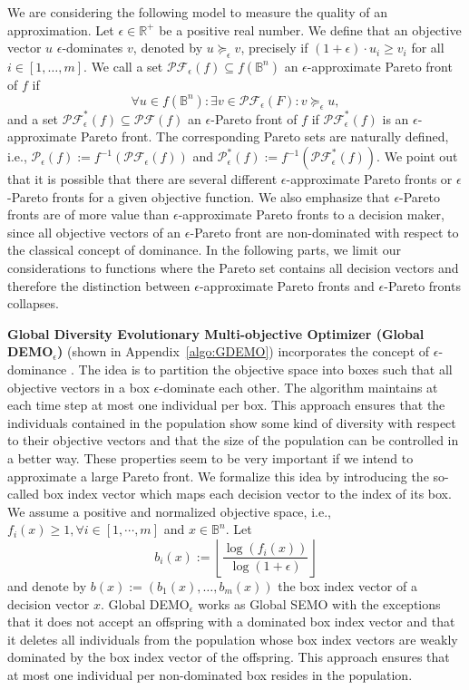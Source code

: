 We are considering the following model to measure the quality of an approximation. Let $\epsilon\in\mathbb{R}^+$ be a positive real number. We define that an objective vector $u$ $\epsilon$-dominates $v$, denoted by $u\succeq_\epsilon v$, precisely if $(1+\epsilon)\cdot u_i \geqslant v_i$ for all $i\in [1,\dots,m]$. We call a set $\mathscr{PF}_{\epsilon}(f) \subseteq f(\mathbb{B}^n)$ an $\epsilon$-approximate Pareto front of $f$ if 
\[\forall u\in f(\mathbb{B}^n): \exists v\in \mathscr{PF}_{\epsilon}(F): v\succeq_{\epsilon} u,\]
and a set $\mathscr{PF}^{\ast}_{\epsilon}(f) \subseteq \mathscr{PF}(f)$ an $\epsilon$-Pareto front of $f$ if $\mathscr{PF}^{\ast}_{\epsilon}(f)$ is an $\epsilon$-approximate Pareto front. The corresponding Pareto sets are naturally defined, i.e., $\mathscr{P}_{\epsilon}(f) := f^{-1}(\mathscr{PF}_{\epsilon}(f))$ and $\mathscr{P}^{\ast}_{\epsilon}(f) := f^{-1}(\mathscr{PF}^{\ast}_{\epsilon}(f))$. We point out that it is possible that there are several different $\epsilon$-approximate Pareto fronts or $\epsilon$-Pareto fronts for a given objective function. We also emphasize that $\epsilon$-Pareto fronts are of more value than $\epsilon$-approximate Pareto fronts to a decision maker, since all objective vectors of an $\epsilon$-Pareto front are non-dominated with respect to the classical concept of dominance. In the following parts, we limit our considerations to functions where the Pareto set contains all decision vectors and therefore the distinction between $\epsilon$-approximate Pareto fronts and $\epsilon$-Pareto fronts collapses.

\vspace{3ex}
\textbf{Global Diversity Evolutionary Multi-objective Optimizer (Global DEMO$_{\epsilon}$)} (shown in Appendix~\ref{algo:GDEMO}) incorporates the concept of $\epsilon$-dominance \cite{horoba2008benefits}. The idea is to partition the objective space into boxes such that all objective vectors in a box $\epsilon$-dominate each other. The algorithm maintains at each time step at most one individual per box. This approach ensures that the individuals contained in the population show some kind of diversity with respect to their objective vectors and that the size of the population can be controlled in a better way. These properties seem to be very important if we intend to approximate a large Pareto front. We formalize this idea by introducing the so-called box index vector which maps each decision vector to the index of its box. We assume a positive and normalized objective space, i.e., $f_i(x) \geqslant 1, \forall i \in [1,\cdots,m]$ and $x \in \mathbb{B}^n$. Let
\[b_i(x):=\left\lfloor \frac{\log{(f_i(x))}}{\log{(1+\epsilon)}}\right\rfloor\]
and denote by $b(x):= (b_1(x),\dots,b_m(x))$ the box index vector of a decision vector $x$. Global DEMO$_{\epsilon}$ works as Global SEMO with the exceptions that it does not accept an offspring with a dominated box index vector and that it deletes all individuals from the population whose box index vectors are weakly dominated by the box index vector of the offspring. This approach ensures that at most one individual per non-dominated box resides in the population.
